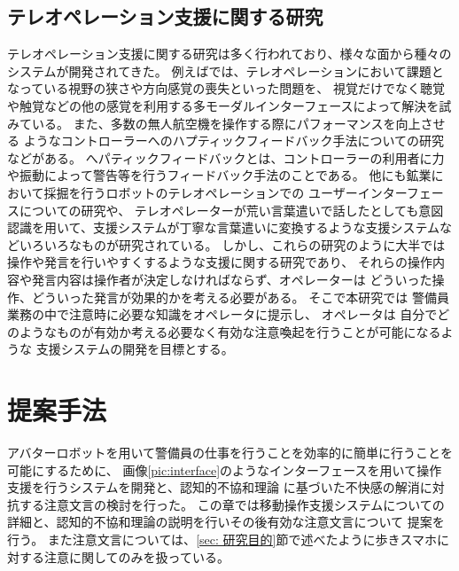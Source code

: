 \documentclass{kuisthesis}
\begin{document}
\subsection{テレオペレーション支援に関する研究}
テレオペレーション支援に関する研究は多く行われており、様々な面から種々のシステムが開発されてきた。
例えば\cite{chen2007human,triantafyllidis2020study}では、テレオペレーションにおいて課題となっている視野の狭さや方向感覚の喪失といった問題を、
視覚だけでなく聴覚や触覚などの他の感覚を利用する多モーダルインターフェースによって解決を試みている。
また、多数の無人航空機を操作する際にパフォーマンスを向上させる
ようなコントローラーへのハプティックフィードバック手法についての研究\cite{son2011measuring}などがある。
へパティックフィードバックとは、コントローラーの利用者に力や振動によって警告等を行うフィードバック手法のことである。
他にも鉱業において採掘を行うロボットのテレオペレーションでの
ユーザーインターフェースについての研究\cite{hainsworth2001teleoperation}や、
テレオペレーターが荒い言葉遣いで話したとしても意図認識を用いて、支援システムが丁寧な言葉遣いに変換するような支援システム\cite{Daneshmand2023}などいろいろなものが研究されている。
しかし、これらの研究のように大半では操作や発言を行いやすくするような支援に関する研究であり、
それらの操作内容や発言内容は操作者が決定しなければならず、オペレーターは
どういった操作、どういった発言が効果的かを考える必要がある。
そこで本研究では
警備員業務の中で注意時に必要な知識をオペレータに提示し、
オペレータは
自分でどのようなものが有効か考える必要なく有効な注意喚起を行うことが可能になるような
支援システムの開発を目標とする。


\section{提案手法}
アバターロボットを用いて警備員の仕事を行うことを効率的に簡単に行うことを可能にするために、
画像\ref{pic:interface}のようなインターフェースを用いて操作支援を行うシステムを開発と、認知的不協和理論\cite{Festinger1957}
に基づいた不快感の解消に対抗する注意文言の検討を行った。
この章では移動操作支援システムについての詳細と、認知的不協和理論の説明を行いその後有効な注意文言について
提案を行う。
また注意文言については、\ref{sec: 研究目的}節で述べたように歩きスマホに対する注意に関してのみを扱っている。
\end{document}

